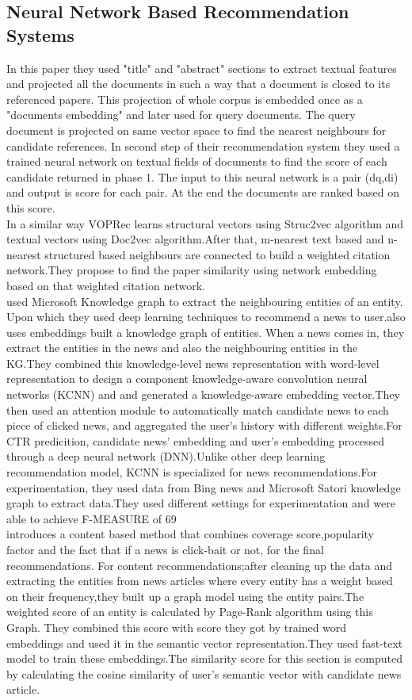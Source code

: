  \subsection{Neural Network Based Recommendation Systems}
 In this paper\cite{N1} they used "title" and "abstract" sections to extract textual features and projected all the documents in such a way that a document is closed to its referenced papers. This projection of whole corpus is embedded once as a "documents embedding" and later used for query documents. The query document is projected on same vector space to find the nearest neighbours for candidate references. In second step of their recommendation system they used a trained neural network on textual fields of documents to find the score of each candidate returned in phase 1. The input to this neural network is a pair (dq,di) and output is score for each pair. At the end the documents are ranked based on this score.
 \\In a similar way \cite{N2} VOPRec learns structural vectors using Struc2vec algorithm and textual vectors using Doc2vec algorithm.After that, m-nearest text based and n-nearest structured based neighbours are connected to build a weighted citation network.They propose to find the paper similarity using network embedding based on that weighted citation network.
\\
\cite{N3}used Microsoft Knowledge graph to extract the neighbouring entities of an entity. Upon which they used deep learning techniques to recommend a news to user.also uses embeddings built a knowledge graph of entities. When a news comes in, they extract the entities in the news and also the neighbouring entities in the KG.They combined this knowledge-level news representation with word-level representation to design a component knowledge-aware convolution neural networks (KCNN) and and generated a knowledge-aware embedding vector.They then used an attention module to automatically match candidate news to each piece of clicked news, and aggregated the user’s history with different weights.For CTR predicition, candidate news' embedding and user’s embedding processed through a deep neural network (DNN).Unlike other deep learning recommendation model, KCNN is specialized for news recommendations.For experimentation, they used data from Bing news and Microsoft Satori knowledge graph to extract data.They used different settings for experimentation and were able to achieve F-MEASURE of 69%
\\
\cite{N10}introduces a content based method that combines coverage score,popularity factor and the fact that if a news is click-bait or not, for the final recommendations. For content recommendations;after cleaning up the data and extracting the entities from news articles where every entity has a weight based on their frequency,they built up a graph model using the entity pairs.The weighted score of an entity is calculated by Page-Rank algorithm using this Graph. They combined this score with score they got by trained word embeddings and used it in the semantic vector representation.They used fast-text model to train these embeddings.The similarity score for this section is computed by calculating the cosine similarity of user's semantic vector with candidate news article.
